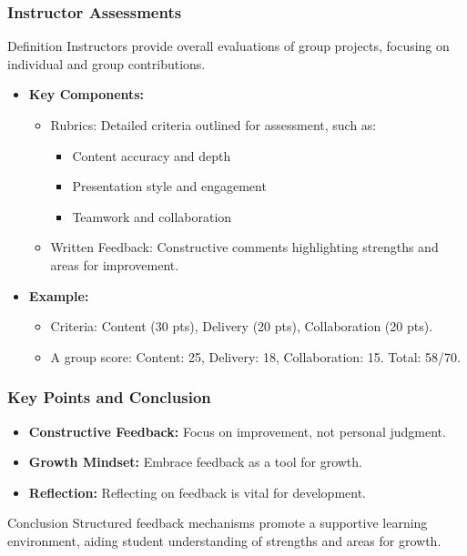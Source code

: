 \documentclass{beamer}
\begin{document}
\begin{frame}[fragile]
    \frametitle{Instructor Assessments}
    \begin{block}{Definition}
        Instructors provide overall evaluations of group projects, focusing on individual and group contributions.
    \end{block}
    \begin{itemize}
        \item \textbf{Key Components:}
        \begin{itemize}
            \item Rubrics: Detailed criteria outlined for assessment, such as:
            \begin{itemize}
                \item Content accuracy and depth
                \item Presentation style and engagement
                \item Teamwork and collaboration
            \end{itemize}
            \item Written Feedback: Constructive comments highlighting strengths and areas for improvement.
        \end{itemize}
        \item \textbf{Example:} 
        \begin{itemize}
            \item Criteria: Content (30 pts), Delivery (20 pts), Collaboration (20 pts).
            \item A group score: Content: 25, Delivery: 18, Collaboration: 15. Total: 58/70.
        \end{itemize}
    \end{itemize}
\end{frame}

\begin{frame}[fragile]
    \frametitle{Key Points and Conclusion}
    \begin{itemize}
        \item \textbf{Constructive Feedback:} Focus on improvement, not personal judgment.
        \item \textbf{Growth Mindset:} Embrace feedback as a tool for growth.
        \item \textbf{Reflection:} Reflecting on feedback is vital for development.
    \end{itemize}
    \begin{block}{Conclusion}
        Structured feedback mechanisms promote a supportive learning environment, aiding student understanding of strengths and areas for growth.
    \end{block}
\end{frame}
\end{document}
